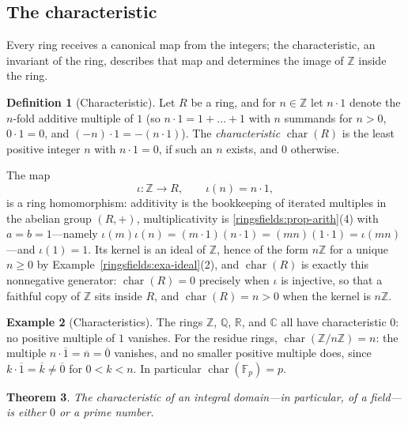 \documentclass[11pt,a4paper]{article}
\newtheorem{theorem}{Theorem}[section]
\theoremstyle{definition}
\newtheorem{definition}[theorem]{Definition}
\newtheorem{example}[theorem]{Example}
\theoremstyle{remark}
\newcommand{\Z}{\ensuremath{\mathbb{Z}}}
\newcommand{\Q}{\ensuremath{\mathbb{Q}}}
\newcommand{\R}{\ensuremath{\mathbb{R}}}
\providecommand{\C}{}\renewcommand{\C}{\ensuremath{\mathbb{C}}}
\newcommand{\Fp}{\ensuremath{\mathbb{F}_{p}}}
\DeclareMathOperator{\charf}{char}
\begin{document}
\subsection{The characteristic}\label{ringsfields:subsec-char}

Every ring receives a canonical map from the integers; the characteristic,
an invariant of the ring, describes that map and determines the image of
\(\Z\) inside the ring.

\begin{definition}[Characteristic]\label{ringsfields:def-char}
Let \(R\) be a ring, and for \(n\in\Z\) let \(n\cdot 1\) denote the
\(n\)-fold additive multiple of \(1\) (so \(n\cdot 1 = 1+\dots+1\) with
\(n\) summands for \(n>0\), \(0\cdot 1=0\), and
\((-n)\cdot 1=-(n\cdot 1)\)). The \emph{characteristic} \(\charf(R)\) is
the least positive integer \(n\) with \(n\cdot 1=0\), if such an \(n\)
exists, and \(0\) otherwise.
\end{definition}

The map
\[
\iota\colon\Z\to R, \qquad \iota(n)=n\cdot 1,
\]
is a ring homomorphism: additivity is the bookkeeping of iterated
multiples in the abelian group \((R,+)\), multiplicativity is
\cref{ringsfields:prop-arith}(4) with \(a=b=1\)---namely
\(\iota(m)\iota(n)=(m\cdot 1)(n\cdot 1)=(mn)(1\cdot 1)=\iota(mn)\)---and
\(\iota(1)=1\). Its kernel is an ideal of \(\Z\), hence of the form
\(n\Z\) for a unique \(n\ge 0\) by Example~\ref{ringsfields:exa-ideal}(2),
and \(\charf(R)\) is exactly this nonnegative generator: \(\charf(R)=0\)
precisely when \(\iota\) is injective, so that a faithful copy of \(\Z\)
sits inside \(R\), and \(\charf(R)=n>0\) when the kernel is \(n\Z\).

\begin{example}[Characteristics]\label{ringsfields:exa-char}
The rings \(\Z\), \(\Q\), \(\R\), and \(\C\) all have characteristic \(0\):
no positive multiple of \(1\) vanishes. For the residue rings,
\(\charf(\Z/n\Z)=n\): the multiple \(n\cdot\overline{1}=\overline{n}
=\overline{0}\) vanishes, and no smaller positive multiple does, since
\(k\cdot\overline{1}=\overline{k}\neq\overline{0}\) for \(0<k<n\). In
particular \(\charf(\Fp)=p\).
\end{example}

\begin{theorem}\label{ringsfields:thm-char-prime}
The characteristic of an integral domain---in particular, of a field---is
either \(0\) or a prime number.
\end{theorem}
\end{document}
